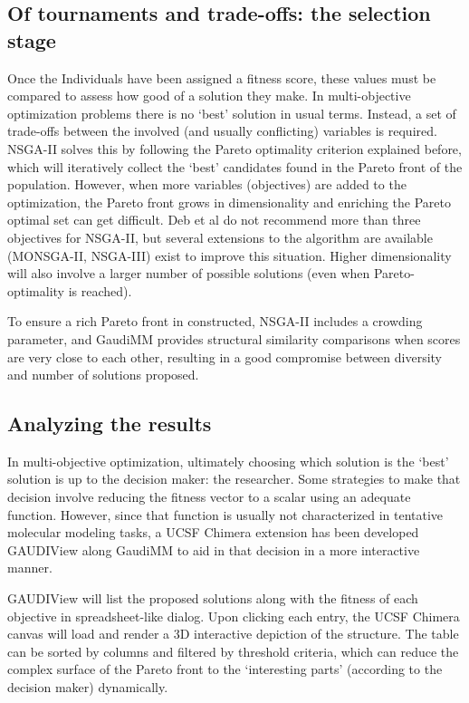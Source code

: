 \subsection{Of tournaments and trade-offs: the selection stage}
Once the Individuals have been assigned a fitness score, these values must be compared to assess how good of a solution they make. In multi-objective optimization problems there is no ‘best’ solution in usual terms. Instead, a set of trade-offs between the involved (and usually conflicting) variables is required. NSGA-II solves this by following the Pareto optimality criterion explained before, which will iteratively collect the ‘best’ candidates found in the Pareto front of the population. However, when more variables (objectives) are added to the optimization, the Pareto front grows in dimensionality and enriching the Pareto optimal set can get difficult. Deb et al do not recommend more than three objectives for NSGA-II, but several extensions to the algorithm are available (MONSGA-II, NSGA-III) exist to improve this situation. Higher dimensionality will also involve a larger number of possible solutions (even when Pareto-optimality is reached).

To ensure a rich Pareto front in constructed, NSGA-II includes a crowding parameter, and GaudiMM provides structural similarity comparisons when scores are very close to each other, resulting in a good compromise between diversity and number of solutions proposed.

\subsection{Analyzing the results}
In multi-objective optimization, ultimately choosing which solution is the ‘best’ solution is up to the decision maker: the researcher. Some strategies to make that decision involve reducing the fitness vector to a scalar using an adequate function. However, since that function is usually not characterized in tentative molecular modeling tasks, a UCSF Chimera extension has been developed GAUDIView along GaudiMM to aid in that decision in a more interactive manner.

GAUDIView will list the proposed solutions along with the fitness of each objective in spreadsheet-like dialog. Upon clicking each entry, the UCSF Chimera canvas will load and render a 3D interactive depiction of the structure. The table can be sorted by columns and filtered by threshold criteria, which can reduce the complex surface of the Pareto front to the ‘interesting parts’ (according to the decision maker) dynamically.





